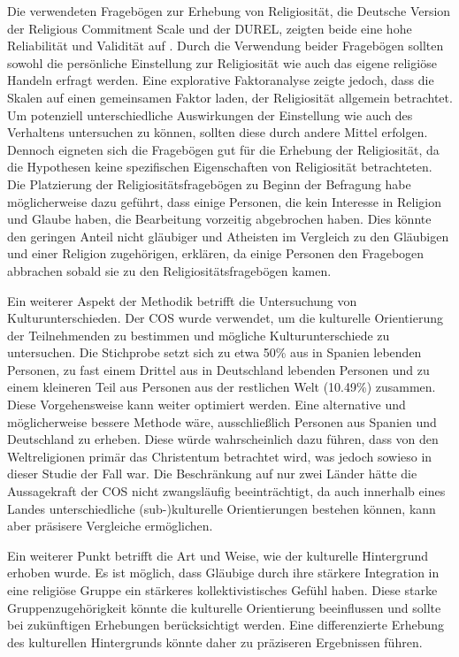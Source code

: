 Die verwendeten Fragebögen zur Erhebung von Religiosität, die Deutsche Version der Religious Commitment Scale und der DUREL, zeigten beide eine hohe Reliabilität und Validität auf \parencite{R_Commitment_Scale, DUREL_Val}. Durch die Verwendung beider Fragebögen sollten sowohl die persönliche Einstellung zur Religiosität wie auch das eigene religiöse Handeln erfragt werden. Eine explorative Faktoranalyse zeigte jedoch, dass die Skalen auf einen gemeinsamen Faktor laden, der Religiosität allgemein betrachtet. Um potenziell unterschiedliche Auswirkungen der Einstellung wie auch des Verhaltens untersuchen zu können, sollten diese durch andere Mittel erfolgen. Dennoch eigneten sich die Fragebögen gut für die Erhebung der Religiosität, da die Hypothesen keine spezifischen Eigenschaften von Religiosität betrachteten. Die Platzierung der Religiositätsfragebögen zu Beginn der Befragung habe möglicherweise dazu geführt, dass einige Personen, die kein Interesse in Religion und Glaube haben, die Bearbeitung vorzeitig abgebrochen haben. Dies könnte den geringen Anteil nicht gläubiger und Atheisten im Vergleich zu den Gläubigen und einer Religion zugehörigen, erklären, da einige Personen den Fragebogen abbrachen sobald sie zu den Religiositätsfragebögen kamen.

Ein weiterer Aspekt der Methodik betrifft die Untersuchung von Kulturunterschieden. Der COS wurde verwendet, um die kulturelle Orientierung der Teilnehmenden zu bestimmen und mögliche Kulturunterschiede zu untersuchen. Die Stichprobe setzt sich zu etwa 50\% aus in Spanien lebenden Personen, zu fast einem Drittel aus in Deutschland lebenden Personen und zu einem kleineren Teil aus Personen aus der restlichen Welt (10.49\%) zusammen. Diese Vorgehensweise kann weiter optimiert werden. Eine alternative und möglicherweise bessere Methode wäre, ausschließlich Personen aus Spanien und Deutschland zu erheben. Diese würde wahrscheinlich dazu führen, dass von den Weltreligionen primär das Christentum betrachtet wird, was jedoch sowieso in dieser Studie der Fall war. Die Beschränkung auf nur zwei Länder hätte die Aussagekraft der COS nicht zwangsläufig beeinträchtigt, da auch innerhalb eines Landes unterschiedliche (sub-)kulturelle Orientierungen bestehen können, kann aber präsisere Vergleiche ermöglichen.

Ein weiterer Punkt betrifft die Art und Weise, wie der kulturelle Hintergrund erhoben wurde. Es ist möglich, dass Gläubige durch ihre stärkere Integration in eine religiöse Gruppe ein stärkeres kollektivistisches Gefühl haben. Diese starke Gruppenzugehörigkeit könnte die kulturelle Orientierung beeinflussen und sollte bei zukünftigen Erhebungen berücksichtigt werden. Eine differenzierte Erhebung des kulturellen Hintergrunds könnte daher zu präziseren Ergebnissen führen.


